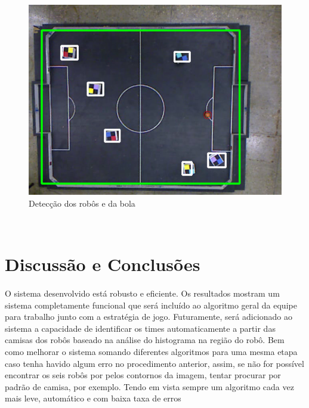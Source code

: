 \documentclass[conference, harvard, brazil, english]{sbatex}
\begin{document}
		\begin{figure}[h]
			\centering
			\includegraphics[scale=0.3]{ball_detection}
			\caption{Detecção dos robôs e da bola}
		\end{figure}\\
		
		
	\section{Discussão e Conclusões}
	\paragraph{}
	O sistema desenvolvido está robusto e eficiente. Os resultados mostram um sistema completamente funcional que será incluído ao algoritmo geral da equipe para trabalho junto com a estratégia de jogo. Futuramente, será adicionado ao sistema a capacidade de identificar os times automaticamente a partir das camisas dos robôs baseado na análise do histograma na região do robô. Bem como melhorar o sistema somando diferentes algoritmos para uma mesma etapa caso tenha havido algum erro no procedimento anterior, assim, se não for possível encontrar os seis robôs por pelos contornos da imagem, tentar procurar por padrão de camisa, por exemplo. Tendo em vista sempre um algoritmo cada vez mais leve, automático e com baixa taxa de erros
\end{document}
